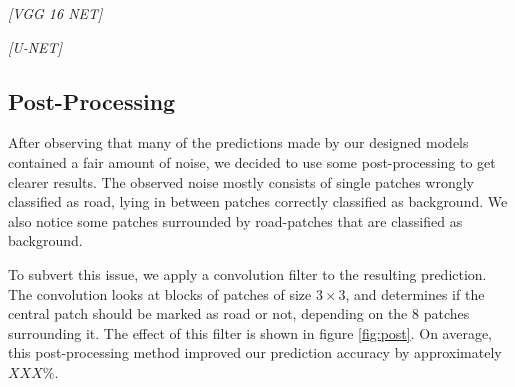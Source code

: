 \documentclass[10pt,conference,compsocconf]{IEEEtran}
\begin{document}
\textit{[VGG 16 NET]}

\textit{[U-NET]}



\subsection{Post-Processing} 
\label{ssec:post}

After observing that many of the predictions made by our designed models contained a fair amount of noise, we decided to use some post-processing to get clearer results. The observed noise mostly consists of single patches wrongly classified as road, lying in between patches correctly classified as background. We also notice some patches surrounded by road-patches that are classified as background.

To subvert this issue, we apply a convolution filter to the resulting prediction. The convolution looks at blocks of patches of size $3 \times 3$, and determines if the central patch should be marked as road or not, depending on the $8$ patches surrounding it. The effect of this filter is shown in figure \ref{fig:post}. On average, this post-processing method improved our prediction accuracy by approximately $XXX\%$.
\end{document}
